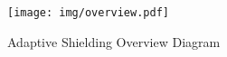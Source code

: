 \begin{figure}
  \texttt{[image: img/overview.pdf]}
  \caption{Adaptive Shielding Overview Diagram}\label{fig:overview-diagram}
  \Description[]{}
\end{figure}
